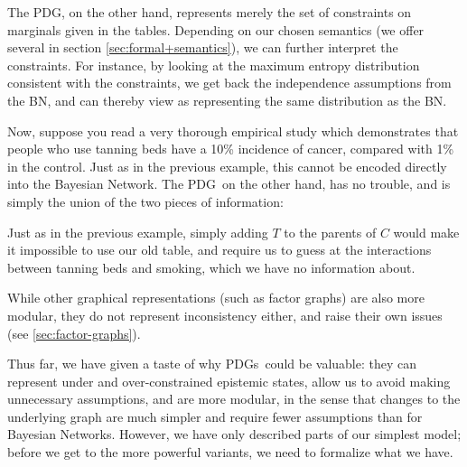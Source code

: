 \documentclass{article}
\newcommand\changed[1]{{\color{note-fg} #1}}
\newcommand{\MN}{PDG}%
\newcommand{\MNs}{PDGs}
\begin{document}
\begin{example}
		The \MN, on the other hand, represents merely the set of constraints on marginals given in the tables. Depending on our chosen semantics (we offer several in section \ref{sec:formal+semantics}), we can further interpret the constraints. For instance, by looking at the maximum entropy distribution consistent with the constraints, we get back the independence assumptions from the BN, and can thereby view  as representing the same distribution as the BN.
				
		Now, suppose you read a very thorough empirical study which demonstrates that people who use tanning beds have a 10\% incidence of cancer, compared with 1\% in the control. Just as in the previous example, this cannot be encoded directly into the Bayesian Network. 
		The \MN\, on the other hand, has no trouble, and is simply the union of the two pieces of information:
		
		\begin{center}
		\end{center}
		\changed{
		Just as in the previous example, simply adding $T$ to the parents of $C$ would make it impossible to use our old table, and require us to guess at the interactions between tanning beds and smoking, which we have no information about.	}
	\end{example}	
	
	\changed{
	While other graphical representations (such as factor graphs) are also more modular, they do not represent inconsistency either, and raise their own issues (see \cref{sec:factor-graphs}). 
	
	Thus far, we have given a taste of why \MNs\ could be valuable: they can represent under and over-constrained epistemic states, allow us to avoid making unnecessary assumptions, and are more modular, in the sense that changes to the underlying graph are much simpler and require fewer assumptions than for Bayesian Networks.	
	However, we have only described parts of our simplest model; before we get to the more powerful variants, we need to formalize what we have.
	}
	
\end{document}
